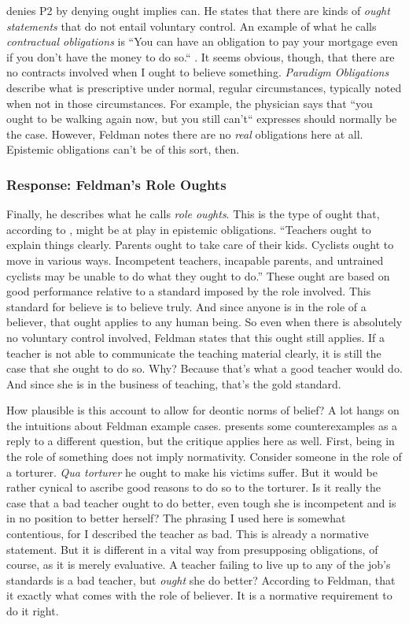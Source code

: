 \documentclass[12pt,numbers=noenddot]{scrartcl}
\begin{document}
\textcite{Feldman2001-FELVBA} denies P2 by denying ought implies can. He states that there are kinds of \emph{ought statements} that do not entail voluntary control. An example of what he calls \emph{contractual obligations} is “You can have an obligation to pay your mortgage even if you don't have the money to do so.“ \autocite[674]{Feldman2000-FELTEO-2}. It seems obvious, though, that there are no contracts involved when I ought to believe something. \emph{Paradigm Obligations} describe what is prescriptive under normal, regular circumstances, typically noted when not in those circumstances. For example, the physician says that “you ought to be walking again now, but you still can't“ \autocite[675]{Feldman2000-FELTEO-2} expresses should normally be the case. However, Feldman notes there are no \emph{real} obligations here at all. Epistemic obligations can't be of this sort, then. 

\subsubsection{Response: Feldman's Role Oughts}

Finally, he describes what he calls \emph{role oughts}. This is the type of ought that, according to \textcite[676]{Feldman2001-FELVBA}, might be at play in epistemic obligations. “Teachers ought to explain things clearly. Parents ought to take care of their kids. Cyclists ought to move in various ways. Incompetent teachers, incapable parents, and untrained cyclists may be unable to do what they ought to do.” These ought are based on good performance relative to a standard imposed by the role involved. This standard for believe is to believe truly. And since anyone is in the role of a believer, that ought applies to any human being. So even when there is absolutely no voluntary control involved, Feldman states that this ought still applies. If a teacher is not able to communicate the teaching material clearly, it is still the case that she ought to do so. Why? Because that's what a good teacher would do. And since she is in the business of teaching, that's the gold standard.

How plausible is this account to allow for deontic norms of belief? A lot hangs on the intuitions about Feldman example cases.
\textcite[9]{Cote-BouchardForthcoming-CTBCTA} presents some counterexamples as a reply to a different question, but the critique applies here as well. First, being in the role of something does not imply normativity. Consider someone in the role of a torturer. \emph{Qua torturer} he ought to make his victims suffer. But it would be rather cynical to ascribe good reasons to do so to the torturer. Is it really the case that a bad teacher ought to do better, even tough she is incompetent and is in no position to better herself? The phrasing I used here is somewhat contentious, for I described the teacher as bad. This is already a normative statement. But it is different in a vital way from presupposing obligations, of course, as it is merely evaluative. A teacher failing to live up to any of the job's standards is a bad teacher, but \emph{ought} she do better? According to Feldman, that it exactly what comes with the role of believer. It is a normative requirement to do it right.
\end{document}
